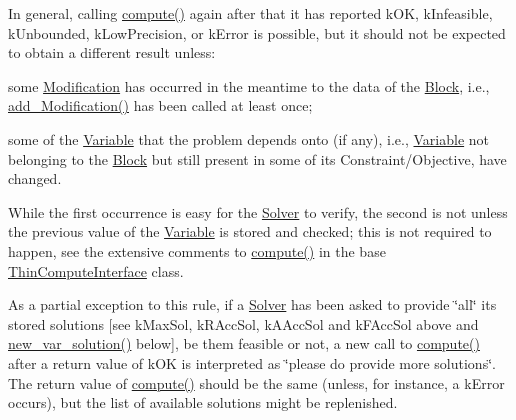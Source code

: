In general, calling \mbox{\hyperlink{class_s_m_spp__di__unipi__it_1_1_solver_a504d4e3e174c7a518cc66156a8a45ce5}{compute()}} again after that it has reported k\+OK, k\+Infeasible, k\+Unbounded, k\+Low\+Precision, or k\+Error is possible, but it should not be expected to obtain a different result unless\+:


\begin{DoxyItemize}
\item some \mbox{\hyperlink{class_s_m_spp__di__unipi__it_1_1_modification}{Modification}} has occurred in the meantime to the data of the \mbox{\hyperlink{class_s_m_spp__di__unipi__it_1_1_block}{Block}}, i.\+e., \mbox{\hyperlink{class_s_m_spp__di__unipi__it_1_1_solver_ae71b15277f34912175559c36e04f98fd}{add\+\_\+\+Modification()}} has been called at least once;
\item some of the \mbox{\hyperlink{class_s_m_spp__di__unipi__it_1_1_variable}{Variable}} that the problem depends onto (if any), i.\+e., \mbox{\hyperlink{class_s_m_spp__di__unipi__it_1_1_variable}{Variable}} not belonging to the \mbox{\hyperlink{class_s_m_spp__di__unipi__it_1_1_block}{Block}} but still present in some of its Constraint/\+Objective, have changed.
\end{DoxyItemize}

While the first occurrence is easy for the \mbox{\hyperlink{class_s_m_spp__di__unipi__it_1_1_solver}{Solver}} to verify, the second is not unless the previous value of the \mbox{\hyperlink{class_s_m_spp__di__unipi__it_1_1_variable}{Variable}} is stored and checked; this is not required to happen, see the extensive comments to \mbox{\hyperlink{class_s_m_spp__di__unipi__it_1_1_solver_a504d4e3e174c7a518cc66156a8a45ce5}{compute()}} in the base \mbox{\hyperlink{class_s_m_spp__di__unipi__it_1_1_thin_compute_interface}{Thin\+Compute\+Interface}} class.

As a partial exception to this rule, if a \mbox{\hyperlink{class_s_m_spp__di__unipi__it_1_1_solver}{Solver}} has been asked to provide \char`\"{}all\char`\"{} its stored solutions \mbox{[}see k\+Max\+Sol, k\+R\+Acc\+Sol, k\+A\+Acc\+Sol and k\+F\+Acc\+Sol above and \mbox{\hyperlink{class_s_m_spp__di__unipi__it_1_1_solver_af109b504a566c90a4ea45c1574c128fe}{new\+\_\+var\+\_\+solution()}} below\mbox{]}, be them feasible or not, a new call to \mbox{\hyperlink{class_s_m_spp__di__unipi__it_1_1_solver_a504d4e3e174c7a518cc66156a8a45ce5}{compute()}} after a return value of k\+OK is interpreted as \char`\"{}please do provide more solutions\char`\"{}. The return value of \mbox{\hyperlink{class_s_m_spp__di__unipi__it_1_1_solver_a504d4e3e174c7a518cc66156a8a45ce5}{compute()}} should be the same (unless, for instance, a k\+Error occurs), but the list of available solutions might be replenished. 

